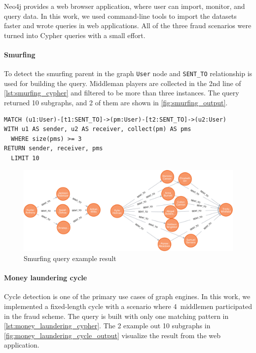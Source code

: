 Neo4j provides a web browser application, where user can import, monitor, and query data.
In this work, we used command-line tools to import the datasets faster and wrote queries in web applications.
All of the three fraud scenarios were turned into Cypher queries with a small effort.

\paragraph{Smurfing}

To detect the smurfing parent in the graph \texttt{User} node and \texttt{SENT\_TO} relationship is used for building the query.
Middleman players are collected in the 2nd line of \autoref{lst:smurfing_cypher} and filtered to be more than three instances.
The query returned 10 subgraphs, and 2 of them are shown in \autoref{fig:smurfing_output}.

\begin{lstlisting}[language=Cypher,frame=single,caption={Cypher smurfing query},label={lst:smurfing_cypher}]
MATCH (u1:User)-[t1:SENT_TO]->(pm:User)-[t2:SENT_TO]->(u2:User)
WITH u1 AS sender, u2 AS receiver, collect(pm) AS pms
  WHERE size(pms) >= 3
RETURN sender, receiver, pms
  LIMIT 10
\end{lstlisting}

\begin{figure}[!ht]
  \centering
  \includegraphics[width=\textwidth]{figures/smurfing_output.png}
  \caption{Smurfing query example result} 
  \label{fig:smurfing_output}
\end{figure}

\paragraph{Money laundering cycle}

Cycle detection is one of the primary use cases of graph engines.
In this work, we implemented a fixed-length cycle with a scenario where 4~middlemen participated in the fraud scheme.
The query is built with only one matching pattern in \autoref{lst:money_laundering_cypher}.
The 2 example out 10 subgraphs in \autoref{fig:money_laundering_cycle_output} visualize the result from the web application. 

